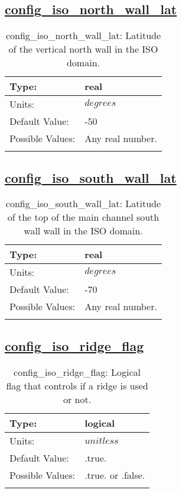 \subsection[config\_iso\_north\_wall\_lat]{\hyperref[sec:nm_tab_iso]{config\_iso\_north\_wall\_lat}}
\label{subsec:nm_sec_config_iso_north_wall_lat}
\begin{center}
\begin{longtable}{| p{2.0in} || p{4.0in} |}
    \hline
    Type: & real \\
    \hline
    Units: & $degrees$ \\
    \hline
    Default Value: & -50 \\
    \hline
    Possible Values: & Any real number. \\
    \hline
    \caption{config\_iso\_north\_wall\_lat: Latitude of the vertical north wall in the ISO domain.}
\end{longtable}
\end{center}
\subsection[config\_iso\_south\_wall\_lat]{\hyperref[sec:nm_tab_iso]{config\_iso\_south\_wall\_lat}}
\label{subsec:nm_sec_config_iso_south_wall_lat}
\begin{center}
\begin{longtable}{| p{2.0in} || p{4.0in} |}
    \hline
    Type: & real \\
    \hline
    Units: & $degrees$ \\
    \hline
    Default Value: & -70 \\
    \hline
    Possible Values: & Any real number. \\
    \hline
    \caption{config\_iso\_south\_wall\_lat: Latitude of the top of the main channel south wall wall in the ISO domain.}
\end{longtable}
\end{center}
\subsection[config\_iso\_ridge\_flag]{\hyperref[sec:nm_tab_iso]{config\_iso\_ridge\_flag}}
\label{subsec:nm_sec_config_iso_ridge_flag}
\begin{center}
\begin{longtable}{| p{2.0in} || p{4.0in} |}
    \hline
    Type: & logical \\
    \hline
    Units: & $unitless$ \\
    \hline
    Default Value: & .true. \\
    \hline
    Possible Values: & .true. or .false. \\
    \hline
    \caption{config\_iso\_ridge\_flag: Logical flag that controls if a ridge is used or not.}
\end{longtable}
\end{center}
